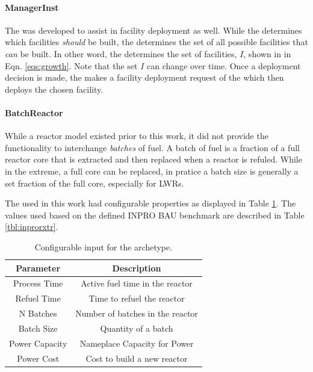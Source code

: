 \paragraph{ManagerInst}

The  was developed to assist in facility deployment as
well. While the  determines which facilities \textit{should}
be built, the  determines the set of all possible facilities
that \textit{can} be built. In other word, the  determines the
set of facilities, $I$, shown in in Eqn. \ref{eqs:growth}. Note that the set $I$
can change over time. Once a deployment decision is made, the
 makes a facility deployment request of the
 which then deploys the chosen facility.

\paragraph{BatchReactor}

While a reactor model existed prior to this work, it did not provide the
functionality to interchange \textit{batches} of fuel. A batch of fuel is a
fraction of a full reactor core that is extracted and then replaced when a
reactor is refuled. While in the extreme, a full core can be replaced, in
pratice a batch size is generally a set fraction of the full core, especially
for LWRs.

The  used in this work had configurable properties as
displayed in Table \ref{tbl:batchrxtr}. The values used based on the defined
INPRO BAU benchmark are described in Table \ref{tbl:inprorxtr}.

\begin{table}[ch]
\centering
\begin{tabular}{cc}
Parameter      & Description                     \\ \hline
Process Time   & Active fuel time in the reactor                        \\
Refuel Time    & Time to refuel the reactor                              \\
N Batches      & Number of batches in the reactor                         \\
Batch Size     & Quantity of a batch                                 \\
Power Capacity & Nameplace Capacity for Power                          \\
Power Cost     & Cost to build a new reactor      \\ \hline
\end{tabular}
\caption{Configurable input for the  archetype.}
\label{tbl:batchrxtr}
\end{table}

